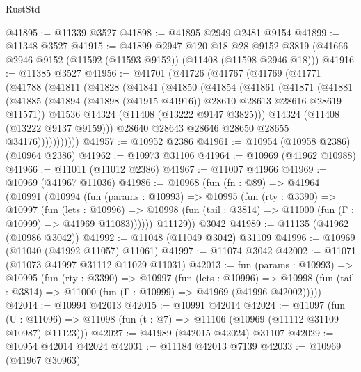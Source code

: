 \begin{lexlean}{RustStd}
\begin{coremodule}
@41895 := @11339 @3527
@41898 := @41895 @2949 @2481 @9154
@41899 := @11348 @3527
@41915 := @41899
    @2947
    @120
    @18
    @28
    @9152
    @3819
    (@41666 @2946 @9152 (@11592 (@11593 @9152)) (@11408 (@11598 @2946 @18)))
@41916 := @11385 @3527
@41956 := @41701
    (@41726
      (@41767
        (@41769
          (@41771
            (@41788
              (@41811
                (@41828
                  (@41841
                    (@41850
                      (@41854
                        (@41861
                          (@41871
                            (@41881
                              (@41885
                                (@41894
                                  (@41898 (@41915 @41916))
                                  @28610
                                  @28613
                                  @28616
                                  @28619
                                  @11571))
                              @41536
                              @14324
                              (@11408 (@13222 @9147 @3825)))
                            @14324
                            (@11408 (@13222 @9137 @9159)))
                          @28640
                          @28643
                          @28646
                          @28650
                          @28655
                          @34176)))))))))))
@41957 := @10952 @2386
@41961 := @10954 (@10958 @2386) (@10964 @2386)
@41962 := @10973 @31106
@41964 := @10969 (@41962 @10988)
@41966 := @11011 (@11012 @2386)
@41967 := @11007 @41966
@41969 := @10969 (@41967 @11036)
@41986 := @10968
    (fun (fn : @89) =>
    @41964
      (@10991
        (@10994
          (fun (params : @10993) =>
          @10995
            (fun (rty : @3390) =>
            @10997
              (fun (lets : @10996) =>
              @10998 (fun (tail : @3814) => @11000 (fun (Γ : @10999) => @41969 @11083))))))
        @11129))
    @3042
@41989 := @11135 (@41962 (@10986 @3042))
@41992 := @11048 (@11049 @3042) @31109
@41996 := @10969 (@11040 (@41992 @11057) @11061)
@41997 := @11074 @3042
@42002 := @11071 (@11073 @41997 @31112 @11029 @11031)
@42013 := fun (params : @10993) =>
  @10995
    (fun (rty : @3390) =>
    @10997
      (fun (lets : @10996) =>
      @10998 (fun (tail : @3814) => @11000 (fun (Γ : @10999) => @41969 (@41996 @42002)))))
@42014 := @10994 @42013
@42015 := @10991 @42014
@42024 := @11097
    (fun (U : @11096) => @11098 (fun (t : @7) => @11106 (@10969 (@11112 @31109 @10987) @11123)))
@42027 := @41989 (@42015 @42024) @31107
@42029 := @10954 @42014 @42024
@42031 := @11184 @42013 @7139
@42033 := @10969 (@41967 @30963)

\end{coremodule}
\end{lexlean}
